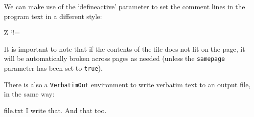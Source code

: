 \documentclass[twoside]{article}
\begin{document}
  We can make use of the `defineactive' parameter to set the comment lines
  in the program text in a different style:

\begin{SideBySideExample}
  Z
  \def\ExclamationPoint{\char33}
  \catcode`!=\active
  \VerbatimInput%
    [defineactive=%
      \def!{\color{cyan}\itshape
        \ExclamationPoint}]
    {hello.f90}
\end{SideBySideExample}

  It is important to note that if the contents of the file does not fit on
the page, it will be automatically broken across pages as needed (unless the
\texttt{samepage} parameter has been set to \texttt{true}).

  There is also a \verb+VerbatimOut+ environment to write verbatim text to an
output file, in the same way:

\begin{SideBySideExample}
  \begin{VerbatimOut}{file.txt}
    I write that.
    And that too.
  \end{VerbatimOut}

\end{SideBySideExample}
\end{document}
